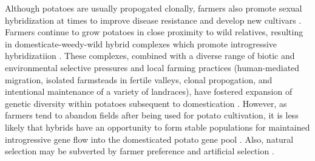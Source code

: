 \documentclass[11pt]{article}
\begin{document}
\begin{enumerate}
Although potatoes are usually propogated clonally, farmers also promote sexual hybridization at times to improve disease resistance and develop new cultivars \cite{quiros1992increase}.
Farmers continue to grow potatoes in close proximity to wild relatives, resulting in domesticate-weedy-wild hybrid complexes which promote introgressive hybridizatiion \cite{rabinowitz1990high, johns1987relationships, linder1987diversity}.
These complexes, combined with a diverse range of biotic and environmental selective pressures and local farming practices (human-mediated migration, isolated farmsteads in fertile valleys, clonal propogation, and intentional maintenance of a variety of landraces), have fostered expansion of genetic diversity within potatoes subsequent to domestication \cite{brush1995potato}.
However, as farmers tend to abandon fields after being used for potato cultivation, it is less likely that hybrids have an opportunity to form stable populations for maintained introgressive gene flow into the domesticated potato gene pool \cite{brush1995potato}.
Also, natural selection may be subverted by farmer preference and artificial selection \cite{brush1981dynamics}.


\end{enumerate}
\end{document}
